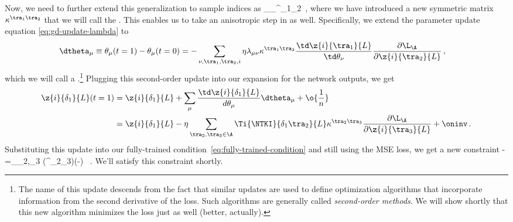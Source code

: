 Now, we need to further extend this generalization to sample indices as
\be\label{eq:generalization-of-generalization}
\eta\lambda_{\mu\nu}\to\eta \lambda_{\mu\nu}\kappa^{\tra_1\tra_2}\, ,
\ee
where we have introduced a new symmetric matrix $\kappa^{\tra_1\tra_2}$ that we will call the .
This enables us to take an anisotropic step in  as well.
Specifically, we extend the parameter update equation \eqref{eq:gd-update-lambda} to
\begin{align}\label{eq:second-order-update}
\dtheta_\mu \equiv\theta_\mu(t=1)-\theta_\mu(t=0) &=  
- \sum_{\nu,\tra_1,\tra_2,i}\eta \lambda_{\mu\nu} \kappa^{\tra_1\tra_2}\frac{\td \z{i}{\tra_1}{L}}{\td \theta_\nu}\frac{\partial \L_{\A}}{\partial \z{i}{\tra_2}{L}} \, ,
\end{align}
which we will call a .\footnote{The name of this update descends from the fact that similar updates are used to define optimization algorithms that
incorporate information from the second derivative of the loss. Such algorithms are generally called \emph{second-order methods}. We will show shortly that this new algorithm minimizes the loss just as well (better, actually).}
Plugging this second-order update 
into our expansion for the network outputs, we get
\begin{align}\label{eq:expansion-outputs}
\z{i}{\delta_1}{L}(t=1) &= \z{i}{\delta_1}{L} + \sum_\mu\frac{\td \z{i}{\delta_1}{L}}{d \theta_\mu}\dtheta_\mu + \o{\frac{1}{n}}  \, \\
&=\z{i}{\delta_1}{L} - \eta\sum_{\tra_2, \tra_3 \in\A}  \Ti{\NTKI}{\delta_1 \tra_2}{L} \kappa^{\tra_2 \tra_3}\frac{\partial \L_{\A}}{\partial \z{i}{\tra_3}{L}} + \oninv \, .\notag
\end{align}
Substituting this update into our fully-trained condition~\eqref{eq:fully-trained-condition} and still using the MSE loss, we get a new constraint
\be\label{eq:newton-minimum-implicit-satisfiable}
-=\sum_{\tra_2,\tra_3 \in\A}\le(\eta {}\kappa^{\tra_2\tra_3}\ri)\le(-\ri) \, .
\ee
We'll satisfy this constraint shortly.







